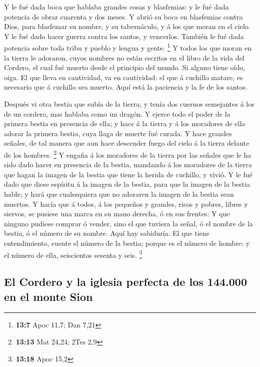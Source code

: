  Y le fué dada boca que hablaba grandes cosas y blasfemias:
y le fué dada potencia de obrar cuarenta y dos meses.  Y
abrió su boca en blasfemias contra Dios, para blasfemar su nombre, y su
tabernáculo, y á los que moran en el cielo.  Y le fué dado
hacer guerra contra los santos, y vencerlos. También le fué dada
potencia sobre toda tribu y pueblo y lengua y gente. \footnote{\textbf{13:7}
  Apoc 11,7; Dan 7,21}  Y todos los que moran en la tierra
le adoraron, cuyos nombres no están escritos en el libro de la vida del
Cordero, el cual fué muerto desde el principio del mundo. 
Si alguno tiene oído, oiga.  El que lleva en cautividad, va
en cautividad: el que á cuchillo matare, es necesario que á cuchillo sea
muerto. Aquí está la paciencia y la fe de los santos.

 Después vi otra bestia que subía de la tierra; y tenía dos
cuernos semejantes á los de un cordero, mas hablaba como un dragón.
 Y ejerce todo el poder de la primera bestia en presencia
de ella; y hace á la tierra y á los moradores de ella adorar la primera
bestia, cuya llaga de muerte fué curada.  Y hace grandes
señales, de tal manera que aun hace descender fuego del cielo á la
tierra delante de los hombres. \footnote{\textbf{13:13} Mat 24,24; 2Tes
  2,9}  Y engaña á los moradores de la tierra por las
señales que le ha sido dado hacer en presencia de la bestia, mandando á
los moradores de la tierra que hagan la imagen de la bestia que tiene la
herida de cuchillo, y vivió.  Y le fué dado que diese
espíritu á la imagen de la bestia, para que la imagen de la bestia
hable; y hará que cualesquiera que no adoraren la imagen de la bestia
sean muertos.  Y hacía que á todos, á los pequeños y
grandes, ricos y pobres, libres y siervos, se pusiese una marca en su
mano derecha, ó en sus frentes:  Y que ninguno pudiese
comprar ó vender, sino el que tuviera la señal, ó el nombre de la
bestia, ó el número de su nombre.  Aquí hay sabiduría. El
que tiene entendimiento, cuente el número de la bestia; porque es el
número de hombre: y el número de ella, seiscientos sesenta y seis.
\footnote{\textbf{13:18} Apoc 15,2}

\hypertarget{el-cordero-y-la-iglesia-perfecta-de-los-144.000-en-el-monte-sion}{%
\subsection{El Cordero y la iglesia perfecta de los 144.000 en el monte
Sion}\label{el-cordero-y-la-iglesia-perfecta-de-los-144.000-en-el-monte-sion}}

